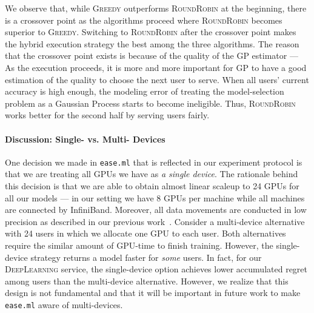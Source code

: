 \documentclass[letterpaper]{vldb}
\newcommand{\eml}{\texttt{ease.ml}\xspace}
\begin{document}
We observe that, while \textsc{Greedy} outperforms \textsc{RoundRobin} at the beginning, there is a crossover point as the algorithms proceed where \textsc{RoundRobin} becomes superior to \textsc{Greedy}.
Switching to \textsc{RoundRobin} after the crossover point makes the hybrid execution strategy the best among the three algorithms.
The reason that the crossover point exists
is because of the quality of the GP estimator ---
As the execution proceeds, it is more
and more important for GP to have a good
estimation of the quality to choose
the next user to serve. When all users'
current accuracy is high enough, the modeling
error of treating the model-selection
problem as a Gaussian Process starts to become
ineligible. Thus, \textsc{RoundRobin}
works better for the second half
by serving users fairly.

\vspace{-1em}
\paragraph*{Discussion: Single- vs. Multi- Devices}
One decision we made in \eml that is reflected in  
our experiment protocol is that we are
treating all GPUs we have as {\em a single device}.
The rationale behind this decision is that 
we are able to obtain almost linear scaleup to
24 GPUs for all our models --- in our
setting we have 8 GPUs per machine while
all machines are connected by InfiniBand.
Moreover, all data movements are conducted in
low precision as described 
in our previous work~\cite{zhang2016zipml}. 
Consider a multi-device alternative
with 24 users in which we allocate one GPU to each user.
Both alternatives require the similar 
amount of GPU-time to finish training. However,
the single-device strategy returns a model
faster for {\em some} users. In fact,
for our \textsc{DeepLearning} service,
the single-device option achieves lower 
accumulated regret among users 
than the multi-device alternative.
However, we realize that this design
is not fundamental and that it will be 
important in future work to make \eml aware of
multi-devices.




\end{document}
